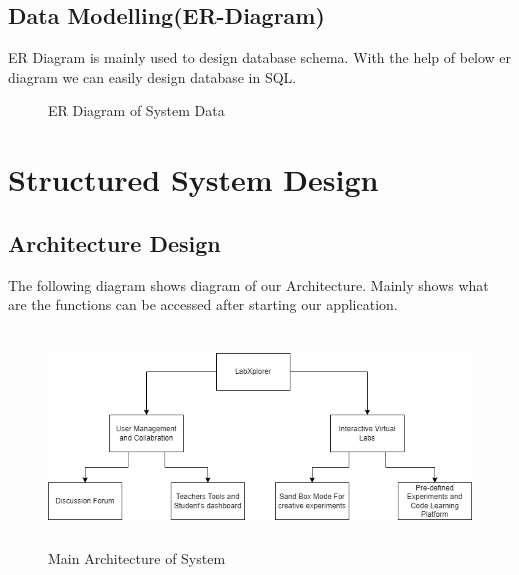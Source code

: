 \subsection{Data Modelling(ER-Diagram)}
ER Diagram is mainly used to design database schema. With the help of below er diagram we can easily design database in SQL.
\begin{figure}[H]
    \caption{ER Diagram of System Data}
\end{figure}
\newpage
\section{Structured System Design}
\subsection{Architecture Design}
The following diagram shows diagram of our Architecture. Mainly shows what are the functions can be accessed after starting our application.
\begin{figure}[H]
    \includegraphics[height = 5.7cm]{Diagrams/Main_Block.png}
    \caption{Main Architecture of System}
\end{figure}
\newpage
